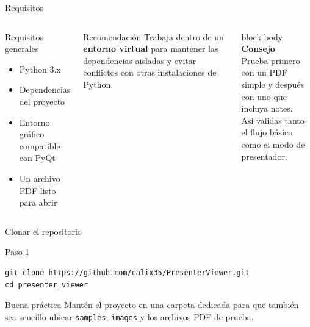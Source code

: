\documentclass[aspectratio=169,professionalfonts]{beamer}
\newcommand{\bluebf}[1]{\textcolor{PVBlue}{\textbf{#1}}}
\newcommand{\dashboardcard}[3]{
\begin{beamercolorbox}[wd=\linewidth,sep=0.9em,rounded=true,shadow=true]{block body}
{\color{PVBlue}\large\bfseries #1}\\[0.35em]
{\normalsize #2}\\[0.45em]
{\color{PVSlate}\small #3}
\end{beamercolorbox}
}
\begin{document}
\begin{frame}{Requisitos}
\begin{columns}[T,totalwidth=\textwidth]
\begin{block}{Requisitos generales}
\begin{itemize}
  \item Python 3.x
  \item Dependencias del proyecto
  \item Entorno gráfico compatible con PyQt
  \item Un archivo PDF listo para abrir
\end{itemize}
\end{block}

\begin{exampleblock}{Recomendación}
Trabaja dentro de un \bluebf{entorno virtual} para mantener las dependencias aisladas y evitar conflictos con otras instalaciones de Python.
\end{exampleblock}

\dashboardcard{Consejo}{Prueba primero con un PDF simple y después con uno que incluya notes.}{Así validas tanto el flujo básico como el modo de presentador.}
\end{columns}

\end{frame}

\begin{frame}[fragile]{Clonar el repositorio}
\begin{block}{Paso 1}
\begin{lstlisting}
git clone https://github.com/calix35/PresenterViewer.git
cd presenter_viewer
\end{lstlisting}
\end{block}

\begin{exampleblock}{Buena práctica}
Mantén el proyecto en una carpeta dedicada para que también sea sencillo ubicar \texttt{samples}, \texttt{images} y los archivos PDF de prueba.
\end{exampleblock}

\end{frame}
\end{document}
